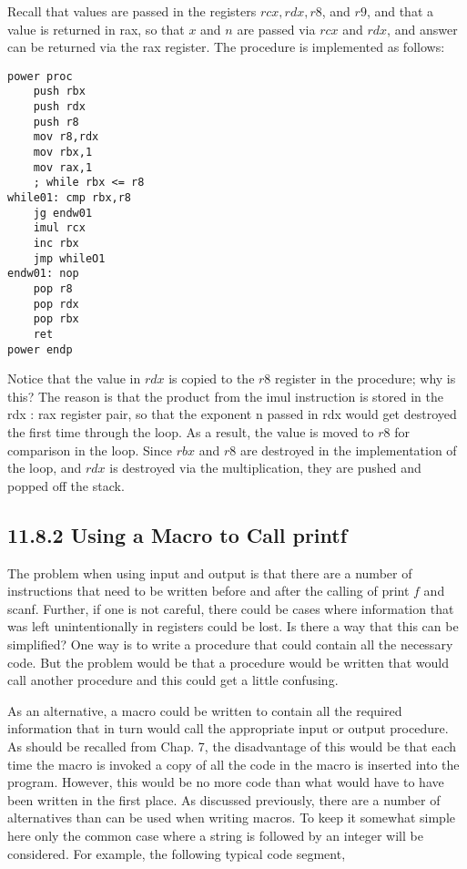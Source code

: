 \documentclass[10pt]{article}
\begin{document}
Recall that values are passed in the registers $r c x, r d x, r 8$, and $r 9$, and that a value is returned in rax, so that $x$ and $n$ are passed via $r c x$ and $r d x$, and answer can be returned via the rax register. The procedure is implemented as follows:

\begin{verbatim}
power proc
    push rbx
    push rdx
    push r8
    mov r8,rdx
    mov rbx,1
    mov rax,1
    ; while rbx <= r8
while01: cmp rbx,r8
    jg endw01
    imul rcx
    inc rbx
    jmp whileO1
endw01: nop
    pop r8
    pop rdx
    pop rbx
    ret
power endp
\end{verbatim}

Notice that the value in $r d x$ is copied to the $r 8$ register in the procedure; why is this? The reason is that the product from the imul instruction is stored in the rdx : rax register pair, so that the exponent n passed in rdx would get destroyed the first time through the loop. As a result, the value is moved to $r 8$ for comparison in the loop. Since $r b x$ and $r 8$ are destroyed in the implementation of the loop, and $r d x$ is destroyed via the multiplication, they are pushed and popped off the stack.

\subsection*{11.8.2 Using a Macro to Call printf}
The problem when using input and output is that there are a number of instructions that need to be written before and after the calling of print $f$ and scanf. Further, if one is not careful, there could be cases where information that was left unintentionally in registers could be lost. Is there a way that this can be simplified? One way is to write a procedure that could contain all the necessary code. But the problem would be that a procedure would be written that would call another procedure and this could get a little confusing.

As an alternative, a macro could be written to contain all the required information that in turn would call the appropriate input or output procedure. As should be recalled from Chap. 7, the disadvantage of this would be that each time the macro is invoked a copy of all the code in the macro is inserted into the program. However, this would be no more code than what would have to have been written in the first place. As discussed previously, there are a number of alternatives than can be used when writing macros. To keep it somewhat simple here only the common case where a string is followed by an integer will be considered. For example, the following typical code segment,
\end{document}
